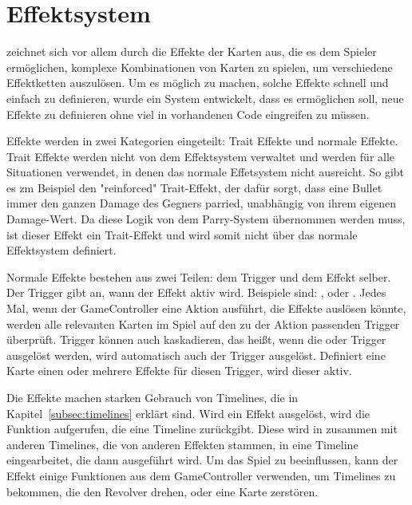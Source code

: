 
\section{Effektsystem}\label{sec:effectsystem}

\renewcommand{\kapitelautor}{Autor: Marvin Kurka}

\FF zeichnet sich vor allem durch die Effekte der Karten aus, die es dem Spieler ermöglichen, komplexe Kombinationen
von Karten zu spielen, um verschiedene Effektketten auszulösen.
Um es möglich zu machen, solche Effekte schnell und einfach zu definieren, wurde ein System entwickelt, dass es
ermöglichen soll, neue Effekte zu definieren ohne viel in vorhandenen Code eingreifen zu müssen.

Effekte werden in zwei Kategorien eingeteilt: Trait Effekte und normale Effekte.
Trait Effekte werden nicht von dem Effektsystem verwaltet und werden für alle Situationen verwendet, in denen das
normale Effetsystem nicht ausreicht.
So gibt es zm Beispiel den "reinforced" Trait-Effekt, der dafür sorgt, dass eine Bullet immer den ganzen Damage
des Gegners parried, unabhängig von ihrem eigenen Damage-Wert.
Da diese Logik von dem Parry-System übernommen werden muss, ist dieser Effekt ein Trait-Effekt und wird somit nicht
über das normale Effektsystem definiert.

Normale Effekte bestehen aus zwei Teilen: dem Trigger und dem Effekt selber.
Der Trigger gibt an, wann der Effekt aktiv wird.
Beispiele sind: ,  oder .
Jedes Mal, wenn der GameController eine Aktion ausführt, die Effekte auslösen könnte, werden alle relevanten Karten
im Spiel auf den zu der Aktion passenden Trigger überprüft.
Trigger können auch kaskadieren, das heißt, wenn \zB die  oder 
Trigger ausgelöst werden, wird automatisch auch der  Trigger ausgelöst.
Definiert eine Karte einen oder mehrere Effekte für diesen Trigger, wird dieser aktiv.

Die Effekte machen starken Gebrauch von Timelines, die in Kapitel~\ref{subsec:timelines} erklärt sind.
Wird ein Effekt ausgelöst, wird die  Funktion aufgerufen, die eine Timeline zurückgibt.
Diese wird in zusammen mit anderen Timelines, die \zB von anderen Effekten stammen, in eine Timeline eingearbeitet,
die dann ausgeführt wird.
Um das Spiel zu beeinflussen, kann der Effekt einige Funktionen aus dem GameController verwenden, um Timelines
zu bekommen, die \zB den Revolver drehen, oder eine Karte zerstören.

